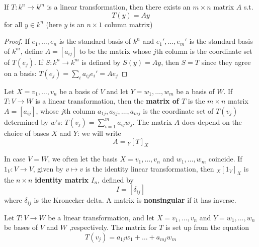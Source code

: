 \documentclass[11pt]{article}
\begin{document}
\begin{proposition}[]
If \(T:k^n\to k^m\) is a linear transformation, then there exists an
\(m\times n\) matrix \(A\) s.t.
\begin{equation*}
T(y)=Ay
\end{equation*}
for all \(y\in k^n\) (here \(y\) is an \(n\times 1\) column matrix) 
\end{proposition}

\begin{proof}
If \(e_1,\dots,e_n\) is the standard basis of \(k^n\) and
\(e_1',\dots,e_m'\) is the standard basis of \(k^m\), define \(A=[a_{ij}]\)
to be the matrix whose \(j\)th column is the coordinate set of \(T(e_j)\).
If \(S:k^n\to k^m\) is defined by \(S(y)=Ay\), then \(S=T\) since they agree
on a basis: \(T(e_j)=\sum_ia_{ij}e_i'=Ae_j\)
\end{proof}

\begin{definition}[]
Let \(X=v_1,\dots,v_n\) be a basis of \(V\) and let \(Y=w_1,\dots,w_m\) be a
basis of \(W\). If \(T:V\to W\) is a linear transformation, then the \textbf{matrix
of \(T\)} is the \(m\times n\) matrix \(A=[a_{ij}]\), whose \(j\)th column
\(a_{1j},a_{2j},\dots,a_{mj}\) is the coordinate set of \(T(v_j)\)
determined by \(w\)'s: \(T(v_j)=\sum_{i=1}^ma_{ij}w_j\). The matrix \(A\) does
depend on the choice of bases \(X\) and \(Y\): we will write
\begin{equation*}
A={}_Y[T]_X
\end{equation*}

In case \(V=W\), we often let the basis \(X=v_1,\dots,v_n\) and
\(w_1,\dots,w_m\) coincide. If \(1_V:V\to V\), given by \(v\mapsto v\) is
the identity linear transformation, then \({}_X[1_V]_X\) is the
\(n\times n\)  \textbf{identity matrix \(I_n\)}, defined by
\begin{equation*}
I=[\delta_{ij}]
\end{equation*}
where \(\delta_{ij}\) is the Kronecker delta. A matrix is \textbf{nonsingular} if it
has inverse.
\end{definition}

\begin{examplle}[]
Let \(T:V\to W\) be a linear transformation, and let \(X=v_1,\dots,v_n\) and
\(Y=w_1,\dots,w_n\) be bases of \(V\) and \(W\) ,respectively. The matrix for
\(T\) is set up from the equation
\begin{equation*}
T(v_j)=a_{1j}w_1+\dots+a_{mj}w_m
\end{equation*}
\end{examplle}
\end{document}
